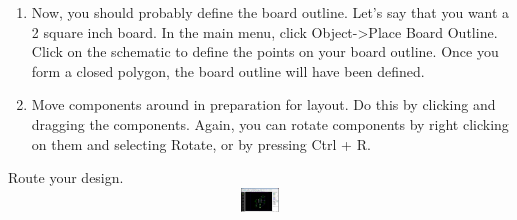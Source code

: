 \documentclass[letterpaper]{article}
\newcounter{saveenum}
\newcommand\liststyleRTFNumvi{%
\renewcommand\theenumi{\arabic{enumi}}
\renewcommand\theenumii{\alph{enumii}}
\renewcommand\theenumiii{\roman{enumiii}}
\renewcommand\theenumiv{\arabic{enumiv}}
\renewcommand\labelenumi{\theenumi.}
\renewcommand\labelenumii{\theenumii.}
\renewcommand\labelenumiii{\theenumiii.}
\renewcommand\labelenumiv{\theenumiv.}
}
\begin{document}
\liststyleRTFNumvi
\setcounter{saveenum}{\value{enumi}}
\begin{enumerate}
\setcounter{enumi}{\value{saveenum}}
\item {\sffamily\color[rgb]{0.30980393,0.5058824,0.7411765}
Now, you should probably define the board outline. Let's say that you want a 2 square inch board. In the main menu,
click Object-{\textgreater}Place Board Outline. Click on the schematic to define the points on your board outline. Once
you form a closed polygon, the board outline will have been defined.}
\item {\sffamily\color[rgb]{0.30980393,0.5058824,0.7411765}
Move components around in preparation for layout. Do this by clicking and dragging the components. Again, you can rotate
components by right clicking on them and selecting {\textquotedbl}Rotate,{\textquotedbl} or by pressing Ctrl + R.}
\end{enumerate}
{\sffamily\color[rgb]{0.30980393,0.5058824,0.7411765}
Route your design.\newline
 \includegraphics[width=13.5in,height=0.252in]{figures/ee4document-img025.png} }
\end{document}
